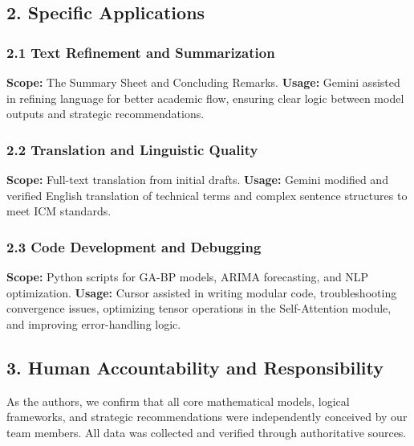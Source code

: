 \documentclass[12pt]{article}
\begin{document}
	\subsection*{2. Specific Applications}
	\subsubsection*{2.1 Text Refinement and Summarization}
	\textbf{Scope:} The Summary Sheet and Concluding Remarks. \textbf{Usage:} Gemini assisted in refining language for better academic flow, ensuring clear logic between model outputs and strategic recommendations.
	
	\subsubsection*{2.2 Translation and Linguistic Quality}
	\textbf{Scope:} Full-text translation from initial drafts. \textbf{Usage:} Gemini modified and verified English translation of technical terms and complex sentence structures to meet ICM standards.
	
	\subsubsection*{2.3 Code Development and Debugging}
	\textbf{Scope:} Python scripts for GA-BP models, ARIMA forecasting, and NLP optimization. \textbf{Usage:} Cursor assisted in writing modular code, troubleshooting convergence issues, optimizing tensor operations in the Self-Attention module, and improving error-handling logic.
	
	\subsection*{3. Human Accountability and Responsibility}
	As the authors, we confirm that all core mathematical models, logical frameworks, and strategic recommendations were independently conceived by our team members. All data was collected and verified through authoritative sources.
	
\end{document}
